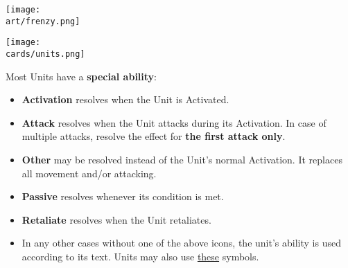 \begin{multicols}{2}
\begin{scaledfigure}[blanker]
  \centering
  \texttt{[image: \\art/frenzy.png]}
\end{scaledfigure}

\begin{center}
  \texttt{[image: \\cards/units.png]}
\end{center}
\bigskip

\vspace*{\fill}

Most Units have a \textbf{special ability}:\par
\begin{itemize}[wide]
  \item\textbf{Activation}  resolves when the Unit is Activated.
  \item\textbf{Attack}  resolves when the Unit attacks during its Activation.
    In case of multiple attacks, resolve the effect for \textbf{the first attack only}.
  \item\textbf{Other}  may be resolved instead of the Unit's normal Activation.
    It replaces all movement and/or attacking.
  \item\textbf{Passive}  resolves whenever its condition is met.
  \item\textbf{Retaliate}  resolves when the Unit retaliates.
  \item In any other cases without one of the above icons, the unit's ability is used according to its text.
    Units may also use \hyperlink{Playerdecks}{these} symbols.
\end{itemize}

\vspace*{\fill}

\columnbreak


\end{multicols}
